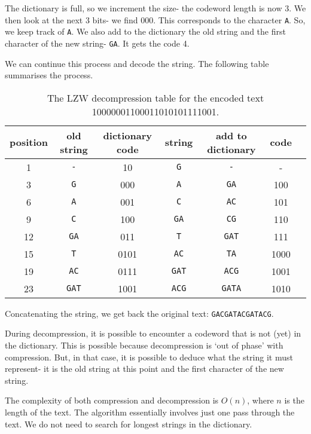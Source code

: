 \documentclass[a4paper, openany]{memoir}
\begin{document}
The dictionary is full, so we increment the size- the codeword length is now 3. We then look at the next 3 bits- we find 000. This corresponds to the character \texttt{A}. So, we keep track of \texttt{A}. We also add to the dictionary the old string and the first character of the new string- \texttt{GA}. It gets the code 4.

We can continue this process and decode the string. The following table summarises the process.
\begin{table}[H]
    \centering
    \begin{tabular}{|c|c|c|c|c|c|c|}
        \hline
        position & old string & dictionary code & string & add to dictionary & code \\
        \hline
        1 & \texttt{-} & 10 & \texttt{G} & \texttt{-} & - \\
        \hline
        3 & \texttt{G} & 000 & \texttt{A} & \texttt{GA} & 100 \\
        \hline
        6 & \texttt{A} & 001 & \texttt{C} & \texttt{AC} & 101 \\
        \hline
        9 & \texttt{C} & 100 & \texttt{GA} & \texttt{CG} & 110 \\
        \hline
        12 & \texttt{GA} & 011 & \texttt{T} & \texttt{GAT} & 111 \\
        \hline
        15 & \texttt{T} & 0101 & \texttt{AC} & \texttt{TA} & 1000 \\
        \hline
        19 & \texttt{AC} & 0111 & \texttt{GAT} & \texttt{ACG} & 1001 \\
        \hline
        23 & \texttt{GAT} & 1001 & \texttt{ACG} & \texttt{GATA} & 1010 \\
        \hline
    \end{tabular}
    \caption{The LZW decompression table for the encoded text 10000001100011010101111001.}
\end{table}
\noindent Concatenating the string, we get back the original text: \texttt{GACGATACGATACG}.

During decompression, it is possible to encounter a codeword that is not (yet) in the dictionary. This is possible because decompression is `out of phase' with compression. But, in that case, it is possible to deduce what the string it must represent- it is the old string at this point and the first character of the new string.

The complexity of both compression and decompression is $O(n)$, where $n$ is the length of the text. The algorithm essentially involves just one pass through the text. We do not need to search for longest strings in the dictionary.
\newpage
\end{document}
